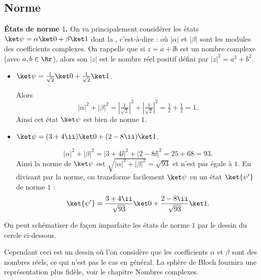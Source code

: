 \documentclass[11pt,class=report,crop=false]{standalone}
\begin{document}
\subsection{Norme}

\textbf{États de norme $1$.} On va principalement considérer les états $\ket\psi = \alpha\ket0+\beta\ket1$ dont la , c'est-à-dire :
où $|\alpha|$ et $|\beta|$ sont les modules des coefficients complexes.
On rappelle que si $z = a+\ii b$ est un nombre complexe (avec $a,b\in\Rr$), alors son  $|z|$ est le nombre réel positif défini par $|z|^2 = a^2+b^2$.

\begin{exemple}
\sauteligne
\begin{itemize}
\item     
$\ket\psi = \frac{1}{\sqrt2} \ket0 + \frac{1}{\sqrt2}\ket1$.  

  Alors 
  $$|\alpha|^2 + |\beta|^2 = \left|\tfrac{1}{\sqrt2}\right|^2+\left|\tfrac{1}{\sqrt2}\right|^2
  = \tfrac12+\tfrac12 = 1.$$
  Ainsi cet état $\ket\psi$ est bien de norme $1$.

\item
$\ket\psi = (3+4\ii)\ket0 + (2-8\ii)\ket1$.

        $$|\alpha|^2 + |\beta|^2 = |3+4\ii|^2 + |2-8\ii|^2 = 25 + 68 = 93.$$
        Ainsi la norme de $\ket\psi$ est $\sqrt{|\alpha|^2 + |\beta|^2} = \sqrt{93}$ et
        n'est pas égale à $1$. En divisant par la norme, on transforme facilement $\ket\psi$ en un état $\ket{\psi'}$ de norme $1$ :
        $$\ket{\psi'} = \frac{3+4\ii}{\sqrt{93}}  \ket0 + \frac{2-8\ii}{\sqrt{93}}\ket1.$$
\end{itemize}
\end{exemple}


\begin{remarque*}
On peut schématiser de façon imparfaite les états de norme $1$ par le dessin du cercle ci-dessous.


Cependant ceci est un dessin où l'on considère que les coefficients $\alpha$ et $\beta$ sont des nombres réels, ce qui n'est pas le cas en général. La \og{}sphère de Bloch\fg{} fournira une représentation plus fidèle, voir le chapitre \og{}Nombres complexes\fg{}.
\end{remarque*}


\end{document}
